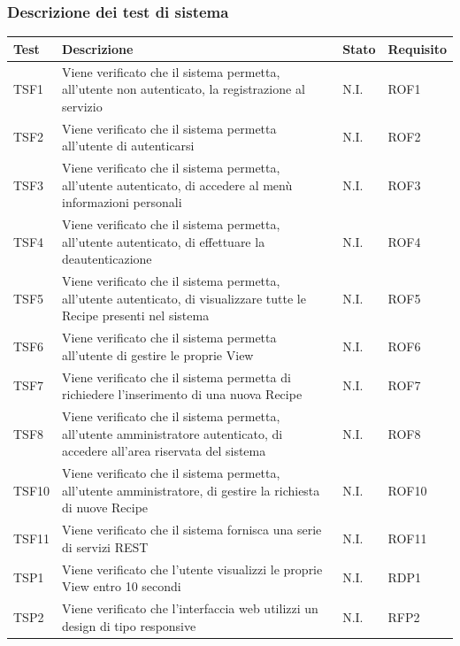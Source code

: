 		\subsubsection{Descrizione dei test di sistema}
			\begin{center}

			\def\arraystretch{1.5}
			\bgroup
			\begin{longtable}{| p{2cm} | p{7.5cm} | p{1.5cm} | p{2cm} |}
					\hline
					\textbf{Test} & \textbf{Descrizione} & \textbf{Stato} & \textbf{Requisito}\\
					\hline						
					TSF1 & Viene verificato che il sistema permetta, all'utente non autenticato, la registrazione al servizio & N.I. & ROF1\\
					\hline
					TSF2 & Viene verificato che il sistema permetta all'utente di autenticarsi & N.I. & ROF2\\
					\hline
					TSF3 & Viene verificato che il sistema permetta, all'utente autenticato, di accedere al menù informazioni personali & N.I. & ROF3\\
					\hline
					TSF4 & Viene verificato che il sistema permetta, all'utente autenticato, di effettuare la deautenticazione & N.I. & ROF4\\
					\hline
					TSF5 & Viene verificato che il sistema permetta, all'utente autenticato, di visualizzare tutte le Recipe presenti nel sistema & N.I. & ROF5\\
					\hline
					TSF6 & Viene verificato che il sistema permetta all'utente di gestire le proprie View & N.I. & ROF6\\
					\hline
					TSF7 & Viene verificato che il sistema permetta di richiedere l'inserimento di una nuova Recipe & N.I. & ROF7\\
					\hline
					TSF8 & Viene verificato che il sistema permetta, all'utente amministratore autenticato, di accedere all'area riservata del sistema & N.I. & ROF8\\
					\hline
					TSF10 & Viene verificato che il sistema permetta, all'utente amministratore, di gestire la richiesta di nuove Recipe & N.I. & ROF10\\
					\hline
					TSF11 & Viene verificato che il sistema fornisca una serie di servizi REST & N.I. & ROF11\\
					\hline
					TSP1 & Viene verificato che l'utente visualizzi le proprie View entro 10 secondi & N.I. & RDP1\\
					\hline
					TSP2 & Viene verificato che l'interfaccia web utilizzi un design di tipo responsive & N.I. & RFP2\\

\end{longtable}
\end{center}
